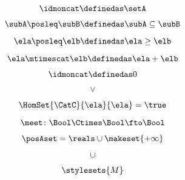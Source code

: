 {\begin{forslides}
    \begin{equation}
        \label{eq:slides_enrichment_33}
        \idmoncat \definedas \setA
    \end{equation}

    \begin{equation}
        \label{eq:slides_enrichment_34}
        \subA \posleq \subB \definedas \subA \subseteq \subB
    \end{equation}

    \begin{equation}
        \label{eq:slides_enrichment_35}
        \ela \posleq \elb \definedas \ela \geq \elb
    \end{equation}

    \begin{equation}
        \label{eq:slides_enrichment_36}
        \ela \mtimescat \elb \definedas \ela + \elb
    \end{equation}

    \begin{equation}
        \label{eq:slides_enrichment_37}
        \idmoncat \definedas 0
    \end{equation}

    \begin{equation}
        \label{eq:slides_enrichment_38}
        \vee
    \end{equation}

    \begin{equation}
        \label{eq:slides_enrichment_39}
        \HomSet{\CatC}{\ela}{\ela} = \true
    \end{equation}

    \begin{equation}
        \label{eq:slides_enrichment_40}
        \meet \colon \Bool \Ctimes \Bool \fto \Bool
    \end{equation}

    \begin{equation}
        \label{eq:slides_enrichment_41}
        \posAset = \reals \cup \makeset{+ \infty}
    \end{equation}

    \begin{equation}
        \label{eq:slides_enrichment_42}
        \cup
    \end{equation}

    \begin{equation}
        \label{eq:slides_enrichment_43}
        \stylesets{M}
    \end{equation}


\end{forslides}}
